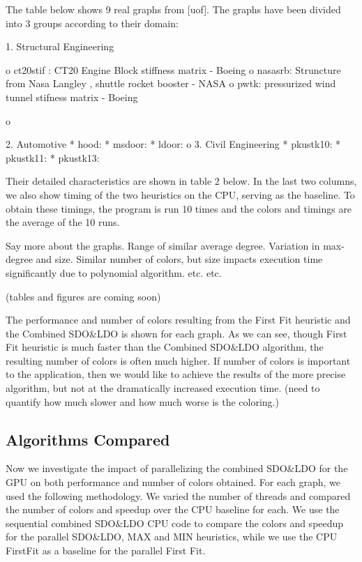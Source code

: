 \documentclass[preprint]{sigplanconf}
\begin{document}
The table below shows 9 real graphs from [uof]. The graphs have been divided into 3 groups according to their domain:

   1. Structural Engineering

          o ct20stif : CT20 Engine Block stiffness matrix - Boeing
          o nasasrb: Struncture from Nasa Langley , shuttle rocket booster - NASA
          o pwtk: pressurized wind tunnel stifness matrix - Boeing


   

o

   2. Automotive
          * hood:
          * msdoor:
          * ldoor:
    o
         3. Civil Engineering
                * pkustk10:
                * pkustk11:
                * pkustk13:

               

            Their detailed characteristics are shown in table 2 below.  In the last two columns, we also show timing of the two heuristics on the CPU, serving as the baseline.  To obtain these timings, the program is run 10 times and the colors and timings are the average of the 10 runs.

            Say more about the graphs.  Range of similar average degree.  Variation in max-degree and size.  Similar number of colors, but size impacts execution time significantly due to polynomial algorithm.  etc. etc.

(tables and figures are coming soon)

The performance and number of colors resulting from the First Fit heuristic and the Combined SDO$\&$LDO is shown for each graph. As we can see, though First Fit heuristic is much faster than the Combined SDO$\&$LDO algorithm, the resulting number of colors is often much higher.  If number of colors is important to the application, then we would like to achieve the results of the more precise algorithm, but not at the dramatically increased execution time.  (need to quantify how much slower and how much worse is the coloring.)

\subsection{Algorithms Compared}

Now we investigate the impact of parallelizing the combined SDO$\&$LDO for the GPU on both performance and number of colors obtained.  For each graph, we used the following methodology. We varied the number of threads and compared the number of colors and speedup over the CPU baseline for each. We use the sequential combined SDO$\&$LDO CPU code to compare the colors and speedup for the parallel SDO$\&$LDO, MAX and MIN heuristics, while we use the CPU FirstFit as a baseline for the parallel First Fit.
\end{document}
